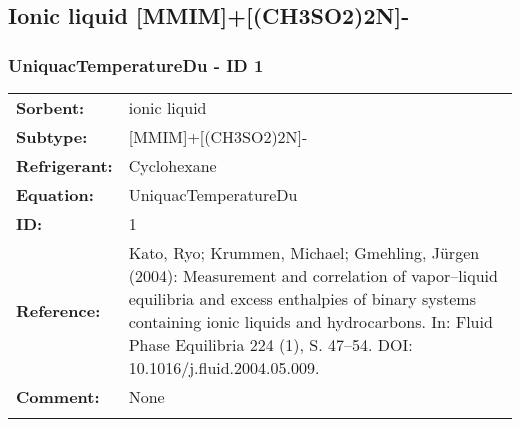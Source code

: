 \subsection{Ionic liquid [MMIM]+[(CH3SO2)2N]-}
%
\subsubsection{UniquacTemperatureDu - ID 1}
%
\begin{tabular}[l]{|lp{11.5cm}|}
\hline
\addlinespace

\textbf{Sorbent:} & ionic liquid \\
\textbf{Subtype:} & [MMIM]+[(CH3SO2)2N]- \\
\textbf{Refrigerant:} & Cyclohexane \\
\textbf{Equation:} & UniquacTemperatureDu \\
\textbf{ID:} & 1 \\
\textbf{Reference:} & Kato, Ryo; Krummen, Michael; Gmehling, Jürgen (2004): Measurement and correlation of vapor–liquid equilibria and excess enthalpies of binary systems containing ionic liquids and hydrocarbons. In: Fluid Phase Equilibria 224 (1), S. 47–54. DOI: 10.1016/j.fluid.2004.05.009. \\
\textbf{Comment:} & None \\

\addlinespace
\hline
\end{tabular}
\newline

